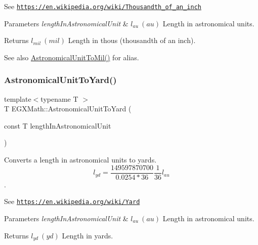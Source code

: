 See \href{https://en.wikipedia.org/wiki/Thousandth_of_an_inch}{\tt https\+://en.\+wikipedia.\+org/wiki/\+Thousandth\+\_\+of\+\_\+an\+\_\+inch} 
\begin{DoxyParams}{Parameters}
{\em length\+In\+Astronomical\+Unit} & $ l_{au}\ (au)$ Length in astronomical units. \\
\hline
\end{DoxyParams}
\begin{DoxyReturn}{Returns}
$ l_{mil}\ (mil)$ Length in thous (thousandth of an inch). 
\end{DoxyReturn}
\begin{DoxySeeAlso}{See also}
\mbox{\hyperlink{group___e_g_x_math-_conversions-_length_conversions-_astronomical-_astronomical_unit-_imperial_ga5a4de19a0aa243fb3b3ea8e014f7c574}{Astronomical\+Unit\+To\+Mil()}} for alias. 
\end{DoxySeeAlso}
\mbox{\label{group___e_g_x_math-_conversions-_length_conversions-_astronomical-_astronomical_unit-_imperial_ga7d383bdfc1850ed19f5b6df13704c7af}} 
\subsubsection{\texorpdfstring{Astronomical\+Unit\+To\+Yard()}{AstronomicalUnitToYard()}}
{\footnotesize\ttfamily template$<$typename T $>$ \\
T E\+G\+X\+Math\+::\+Astronomical\+Unit\+To\+Yard (\begin{DoxyParamCaption}\item[{const T}]{length\+In\+Astronomical\+Unit }\end{DoxyParamCaption})}



Converts a length in astronomical units to yards. \[ l_{yd}= \frac{149597870700}{0.0254 * 36} \frac{1}{36} l_{au} \]. 

See \href{https://en.wikipedia.org/wiki/Yard}{\tt https\+://en.\+wikipedia.\+org/wiki/\+Yard} 
\begin{DoxyParams}{Parameters}
{\em length\+In\+Astronomical\+Unit} & $ l_{au}\ (au)$ Length in astronomical units. \\
\hline
\end{DoxyParams}
\begin{DoxyReturn}{Returns}
$ l_{yd}\ (yd)$ Length in yards. 
\end{DoxyReturn}
